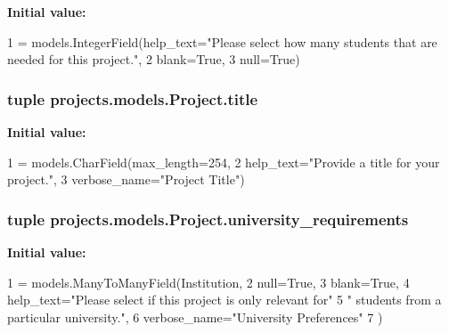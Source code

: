 {\bfseries Initial value\-:}
\begin{DoxyCode}
1 = models.IntegerField(help\_text=\textcolor{stringliteral}{"Please select how many students that are needed for this project."},
2                                           blank=\textcolor{keyword}{True},
3                                           null=\textcolor{keyword}{True})
\end{DoxyCode}
\hypertarget{classprojects_1_1models_1_1_project_a95d8dc587248d689b9d859eab80ded77}{
\subsubsection[{title}]{\setlength{\rightskip}{0pt plus 5cm}tuple projects.\-models.\-Project.\-title\hspace{0.3cm}{\ttfamily [static]}}}\label{classprojects_1_1models_1_1_project_a95d8dc587248d689b9d859eab80ded77}
{\bfseries Initial value\-:}
\begin{DoxyCode}
1 = models.CharField(max\_length=254,
2                              help\_text=\textcolor{stringliteral}{"Provide a title for your project."},
3                              verbose\_name=\textcolor{stringliteral}{"Project Title"})
\end{DoxyCode}
\hypertarget{classprojects_1_1models_1_1_project_a28d10ba02919498d63374cbc2c86b8e6}{
\subsubsection[{university\-\_\-requirements}]{\setlength{\rightskip}{0pt plus 5cm}tuple projects.\-models.\-Project.\-university\-\_\-requirements\hspace{0.3cm}{\ttfamily [static]}}}\label{classprojects_1_1models_1_1_project_a28d10ba02919498d63374cbc2c86b8e6}
{\bfseries Initial value\-:}
\begin{DoxyCode}
1 = models.ManyToManyField(Institution,
2                                                      null=\textcolor{keyword}{True},
3                                                      blank=\textcolor{keyword}{True},
4                                                      help\_text=\textcolor{stringliteral}{"Please select if this project is only
       relevant for"}
5                                                                \textcolor{stringliteral}{" students from a particular university."},
6                                                      verbose\_name=\textcolor{stringliteral}{"University Preferences"}
7     )
\end{DoxyCode}
